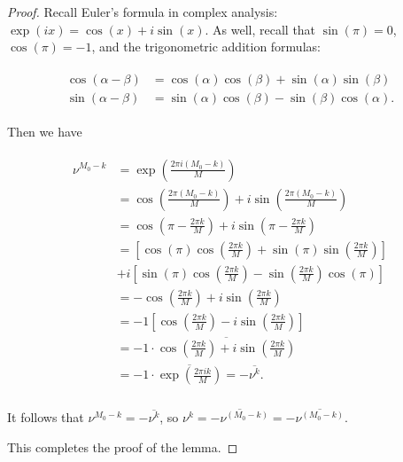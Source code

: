 \documentclass[11pt, oneside]{Thesis} %
\providecommand{\DIFdelbegin}{} %
\begin{document}
\begin{proof}
Recall Euler's formula in complex analysis:
$\exp(ix) = \cos(x) + i \sin(x)$. As well, recall that
$\sin(\pi)=0$, $\cos(\pi)=-1$, and the trigonometric
addition formulas:

\begin{align}
\begin{split}
\cos(\alpha-\beta) &= \cos(\alpha) \cos(\beta) + \sin(\alpha) \sin(\beta) \\
\sin(\alpha-\beta) &= \sin(\alpha) \cos(\beta) - \sin(\beta) \cos(\alpha).
\end{split}
\end{align}

Then we have

\begin{align}
\begin{split}
\nu^{M_0-k} &= \exp\left(\frac{2 \pi i (M_0-k)}{M}\right) \\
&= \cos\left(\frac{2 \pi (M_0-k)}{M}\right) + i
\sin\left(\frac{2 \pi (M_0-k)}{M}\right) \\
&= \cos\left(\pi - \frac{2 \pi k}{M}\right) + i
\sin\left(\pi - \frac{2 \pi k}{M}\right) \\
&=
\left[
\cos(\pi) \cos\left(\frac{2 \pi k}{M}\right) +
\sin(\pi) \sin\left(\frac{2 \pi k}{M}\right)
\right] \\
&+
i \left[
\sin(\pi) \cos\left(\frac{2 \pi k}{M}\right) -
\sin\left(\frac{2 \pi k}{M}\right) \cos(\pi)
\right] \\
&=
-\cos\left(\frac{2 \pi k}{M}\right) + i
\sin\left(\frac{2 \pi k}{M}\right) \\
&=
-1 \left[ \cos\left(\frac{2 \pi k}{M}\right) - i
\sin\left(\frac{2 \pi k}{M}\right) \right] \\
&=
-1 \cdot \overline{\cos\left(\frac{2 \pi k}{M}\right) + i
\sin\left(\frac{2 \pi k}{M}\right)}  \\
&=
-1 \cdot \overline{\exp\left(\frac{2 \pi i k}{M}\right)} = - \overline{\nu^k} . \\
\end{split}
\end{align}

It follows that
$\nu^{M_0-k} = -\overline{\nu^k}$, so
$\nu^{k} = \overline{- \nu^{(M_0-k)}} = -\overline{\nu^{(M_0-k)}}$.

This completes the proof of the lemma.
\end{proof}


\DIFdelbegin %
\end{document}
